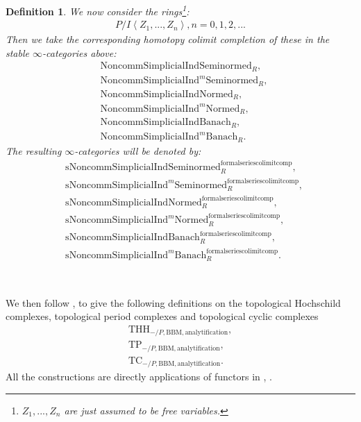 \documentclass[12pt]{book}
\newtheorem{definition}{Definition}
\begin{document}
\begin{definition}
We now consider the rings\footnote{$Z_1,...,Z_n$ are just assumed to be free variables.}:
\begin{align}
P/I\left<Z_1,...,Z_n\right>,n=0,1,2,...	
\end{align}
Then we take the corresponding homotopy colimit completion of these in the stable $\infty$-categories above:
\begin{align}
&\mathrm{Noncomm}\mathrm{Simplicial}\mathrm{Ind}\mathrm{Seminormed}_R,\\
&\mathrm{Noncomm}\mathrm{Simplicial}\mathrm{Ind}^m\mathrm{Seminormed}_R,\\
&\mathrm{Noncomm}\mathrm{Simplicial}\mathrm{Ind}\mathrm{Normed}_R,\\
&\mathrm{Noncomm}\mathrm{Simplicial}\mathrm{Ind}^m\mathrm{Normed}_R,\\
&\mathrm{Noncomm}\mathrm{Simplicial}\mathrm{Ind}\mathrm{Banach}_R,\\
&\mathrm{Noncomm}\mathrm{Simplicial}\mathrm{Ind}^m\mathrm{Banach}_R.	
\end{align}
The resulting $\infty$-categories will be denoted by:
\begin{align}
&\mathrm{sNoncomm}\mathrm{Simplicial}\mathrm{Ind}\mathrm{Seminormed}^\mathrm{formalseriescolimitcomp}_R,\\
&\mathrm{sNoncomm}\mathrm{Simplicial}\mathrm{Ind}^m\mathrm{Seminormed}^\mathrm{formalseriescolimitcomp}_R,\\
&\mathrm{sNoncomm}\mathrm{Simplicial}\mathrm{Ind}\mathrm{Normed}^\mathrm{formalseriescolimitcomp}_R,\\
&\mathrm{sNoncomm}\mathrm{Simplicial}\mathrm{Ind}^m\mathrm{Normed}^\mathrm{formalseriescolimitcomp}_R,\\
&\mathrm{sNoncomm}\mathrm{Simplicial}\mathrm{Ind}\mathrm{Banach}^\mathrm{formalseriescolimitcomp}_R,\\
&\mathrm{sNoncomm}\mathrm{Simplicial}\mathrm{Ind}^m\mathrm{Banach}^\mathrm{formalseriescolimitcomp}_R.	
\end{align}	
\end{definition}
\

\indent We then follow \cite[Section 2.3]{BMS}, \cite[Chapter 3]{NS} to give the following definitions on the topological Hochschild complexes, topological period complexes and topological cyclic complexes
\begin{align}
 \mathrm{THH}_{-/P,\mathrm{BBM},\mathrm{analytification}},\\
 \mathrm{TP}_{-/P,\mathrm{BBM},\mathrm{analytification}},\\
 \mathrm{TC}_{-/P,\mathrm{BBM},\mathrm{analytification}}. 
\end{align}
 All the constructions are directly applications of functors in \cite[Section 2.3]{BMS}, \cite[Chapter 3]{NS}.
\end{document}
